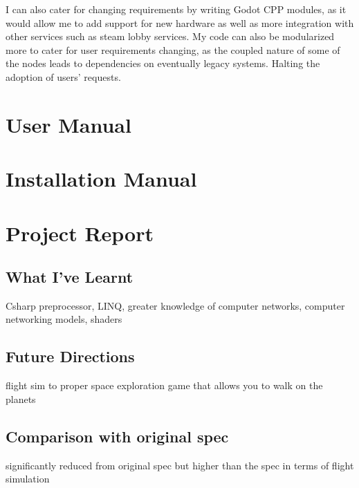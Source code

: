 \documentclass[12pt, DIV=calc]{scrartcl}
\begin{document}
I can also cater for changing requirements by writing Godot CPP modules, as it would allow me to add support for new hardware as well as more integration with other services such as steam lobby services. My code can also be modularized more to cater for user requirements changing, as the coupled nature of some of the nodes leads to dependencies on eventually legacy systems. Halting the adoption of users' requests. 



\clearpage
\section{User Manual}




\clearpage
\section{Installation Manual}




\clearpage
\section{Project Report}
\subsection{What I've Learnt}
Csharp preprocessor, LINQ, greater knowledge of computer networks, computer networking models, shaders

\subsection{Future Directions}
flight sim to proper space exploration game that allows you to walk on the planets

\subsection{Comparison with original spec}
significantly reduced from original spec but higher than the spec in terms of flight simulation
\end{document}
